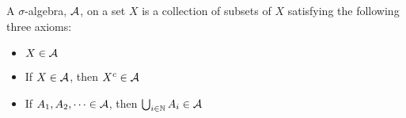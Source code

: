 \documentclass[../../main.tex]{subfiles}
\begin{document}
\begin{definition}
A $\sigma$-algebra, $\mathcal{A}$, on a set $X$ is a collection of subsets of $X$ satisfying the following three axioms:
\begin{itemize}
\item $X \in \mathcal{A}$
\item If $X \in \mathcal{A}$, then $X^c \in \mathcal{A}$
\item If $A_1, A_2, \dots \in \mathcal{A}$, then $\bigcup_{i \in \mathbb{N}} A_i \in \mathcal{A}$
\end{itemize}
\end{definition}
\end{document}
